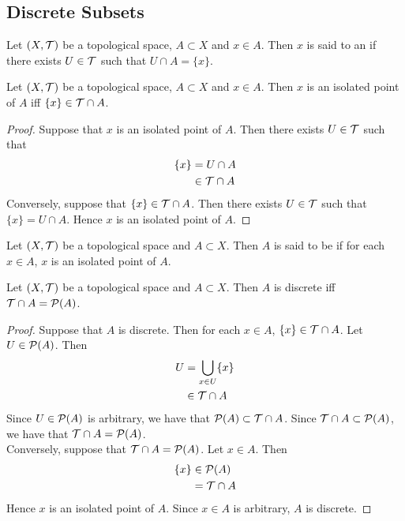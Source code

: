 \documentclass{book}
\begin{document}
\subsection{Discrete Subsets}

\begin{defn}
	Let $(X, \mathcal{T})$ be a topological space, $A \subset X$ and $x \in A$. Then $x$ is said to an  if there exists $U \in \mathcal{T}$ such that $U \cap A = \{x\}$. 
\end{defn}

\begin{ex}
	Let $(X, \mathcal{T})$ be a topological space, $A \subset X$ and $x \in A$. Then $x$ is an isolated point of $A$ iff $\{x\} \in \mathcal{T} \cap A$.
\end{ex}

\begin{proof}
	Suppose that $x$ is an isolated point of $A$. Then there exists $U \in \mathcal{T}$ such that 
	\begin{align*}
		\{x\}
		& = U \cap A \\
		& \in \mathcal{T} \cap A
	\end{align*} 
	Conversely, suppose that $\{x\} \in \mathcal{T} \cap A$. Then there exists $U \in \mathcal{T}$ such that $\{x\} = U \cap A$. Hence $x$ is an isolated point of $A$.
\end{proof}

\begin{defn}
	Let $(X, \mathcal{T})$ be a topological space and $A \subset X$. Then $A$ is said to be  if for each $x \in A$, $x$ is an isolated point of $A$.
\end{defn}

\begin{ex}
	Let $(X, \mathcal{T})$ be a topological space and $A \subset X$. Then $A$ is discrete iff $\mathcal{T} \cap A = \mathcal{P}(A)$. 
\end{ex}

\begin{proof}
	Suppose that $A$ is discrete. Then for each $x \in A$, $\{x\} \in \mathcal{T} \cap A$. Let $U \in \mathcal{P}(A)$. Then 
	\begin{align*}
		U
		& = \bigcup_{x \in U} \{x\} \\
		& \in \mathcal{T} \cap A
	\end{align*}
	Since $U \in \mathcal{P}(A)$ is arbitrary, we have that $\mathcal{P}(A) \subset \mathcal{T} \cap A$. Since $\mathcal{T} \cap A \subset \mathcal{P}(A)$, we have that $\mathcal{T} \cap A = \mathcal{P}(A)$. \\
	Conversely, suppose that $\mathcal{T} \cap A = \mathcal{P}(A)$. Let $x \in A$. Then
	\begin{align*}
		\{x\}
		& \in \mathcal{P}(A) \\
		& = \mathcal{T} \cap A
	\end{align*}	
	Hence $x$ is an isolated point of $A$. Since $x \in A$ is arbitrary, $A$ is discrete.
\end{proof}
\end{document}
